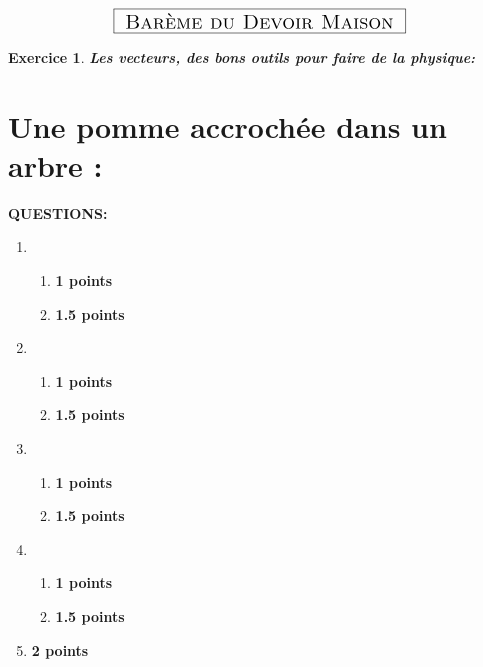 \documentclass[a4paper,10.9pt]{article}
\theoremstyle{definition}
\newtheorem{exo}{Exercice}
\begin{document}
	
\chead{}\renewcommand{\headrulewidth}{0.4pt}\renewcommand{\footrulewidth}{0.4pt}

\hfill\\[-1cm]
$$	\fbox{\text{\Large{ \sc Barème du Devoir Maison }}}$$	


\begin{exo}\textit{\textbf{Les vecteurs, des bons outils pour faire de la physique:}}  
\section*{Une pomme accrochée dans un arbre :}

\textbf{QUESTIONS:}\\
\begin{enumerate}
	\item 
	 \begin{enumerate}
	 	\item \textbf{1 points} \\
	 	\item \textbf{1.5 points} \\
	 \end{enumerate} 
	 
	\item \begin{enumerate}
		\item \textbf{1 points} \\
		\item \textbf{1.5 points} \\
	\end{enumerate}
	\item 
	\begin{enumerate}
		\item \textbf{1 points} \\
		\item \textbf{1.5 points} \\
	\end{enumerate}
	\item
	 \begin{enumerate}
		\item \textbf{1 points} \\
		\item \textbf{1.5 points} \\
	\end{enumerate}
	\item  \textbf{2 points} \\
\end{enumerate}

\end{exo}
\end{document}
